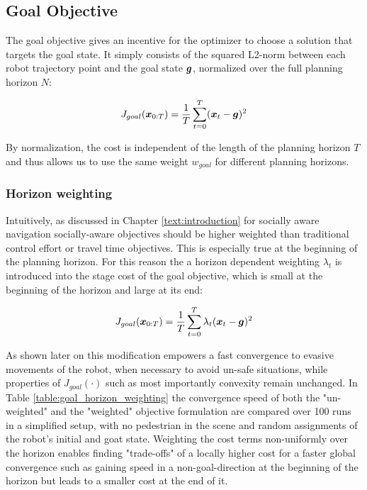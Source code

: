\subsection{Goal Objective}
\label{text:approach/objective/goal}
The goal objective gives an incentive for the optimizer to choose a solution that targets the goal state. It simply consists of the squared L2-norm between each robot trajectory point and the goal state $\boldsymbol{g}$, normalized over the full planning horizon $N$:

\begin{equation}
J_{goal}(\boldsymbol{x}_{0:T}) = \frac{1}{T} \sum_{t = 0}^T (\boldsymbol{x}_t - \boldsymbol{g})^2
\label{eq:goal_unweighted}
\end{equation}

By normalization, the cost is independent of the length of the planning horizon $T$ and thus allows us to use the same weight $w_{goal}$ for different planning horizons.

\subsubsection{Horizon weighting}
Intuitively, as discussed in Chapter \ref{text:introduction} for socially aware navigation socially-aware objectives should be higher weighted than traditional control effort or travel time objectives. This is especially true at the beginning of the planning horizon. For this reason the a horizon dependent weighting $\lambda_t$ is introduced into the stage cost of the goal objective, which is small at the beginning of the horizon and large at its end: 

\begin{equation}
J_{goal}(\boldsymbol{x}_{0:T}) = \frac{1}{T} \sum_{t = 0}^T \lambda_t (\boldsymbol{x}_t - \boldsymbol{g})^2
\label{eq:goal_weighted}
\end{equation}

As shown later on this modification empowers a fast convergence to evasive movements of the robot, when necessary to avoid un-safe situations, while properties of $J_{goal}(\cdot)$ such as most importantly convexity remain unchanged. In Table \ref{table:goal_horizon_weighting} the convergence speed of both the "un-weighted" and the "weighted" objective formulation are compared over 100 runs in a simplified setup, with no pedestrian in the scene and random assignments of the robot's initial and goat state. Weighting the cost terms non-uniformly over the horizon enables finding "trade-offs" of a locally higher cost for a faster global convergence such as gaining speed in a non-goal-direction at the beginning of the horizon but leads to a smaller cost at the end of it. 

